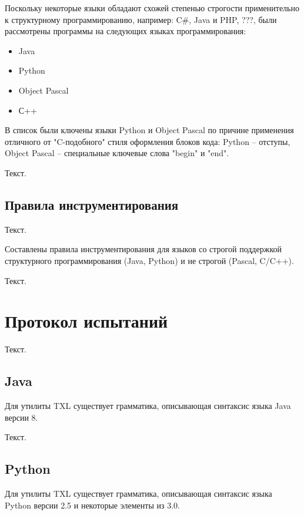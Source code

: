 Поскольку некоторые языки обладают схожей степенью строгости применительно к структурному программированию, например: C\#, Java и PHP, ???, были рассмотрены программы на следующих языках программирования:
\begin{itemize}
  \item Java
  \item Python
  \item Object Pascal
  \item С++
\end{itemize}

В список были ключены языки Python и Object Pascal по причине применения отличного от "C-подобного" стиля оформления блоков кода: Python -- отступы, Object Pascal -- специальные ключевые слова "begin" и "end".

Текст.

\subsection{Правила инструментирования}

Текст.

Составлены правила инструментирования для языков со строгой поддержкой структурного программирования (Java, Python) и не строгой (Pascal, C/C++).

Текст.

\section{Протокол испытаний}

Текст.

\subsection{Java}

Для утилиты TXL существует грамматика, описывающая синтаксис языка Java версии 8.

Текст.

\subsection{Python}

Для утилиты TXL существует грамматика, описывающая синтаксис языка Python версии 2.5 и некоторые элементы из 3.0.

